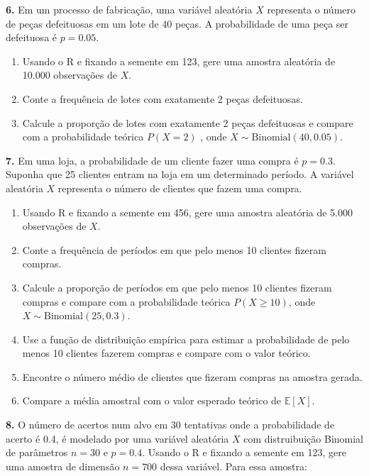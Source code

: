 \documentclass[
]{book}
\providecommand{\tightlist}{%
  \setlength{\itemsep}{0pt}\setlength{\parskip}{0pt}}
\begin{document}
\textbf{6.} Em um processo de fabricação, uma variável aleatória \(X\) representa o número de peças defeituosas em um lote de 40 peças. A probabilidade de uma peça ser defeituosa é \(p = 0.05\).

\begin{enumerate}
\def\labelenumi{(\alph{enumi})}
\tightlist
\item
  Usando o R e fixando a semente em 123, gere uma amostra aleatória de 10.000 observações de \(X\).
\item
  Conte a frequência de lotes com exatamente 2 peças defeituosas.
\item
  Calcule a proporção de lotes com exatamente 2 peças defeituosas e compare com a probabilidade teórica \(P(X = 2)\) , onde \(X \sim \text{Binomial}(40, 0.05)\).
\end{enumerate}

\textbf{7.} Em uma loja, a probabilidade de um cliente fazer uma compra é \(p = 0.3\). Suponha que 25 clientes entram na loja em um determinado período. A variável aleatória \(X\) representa o número de clientes que fazem uma compra.

\begin{enumerate}
\def\labelenumi{(\alph{enumi})}
\tightlist
\item
  Usando R e fixando a semente em 456, gere uma amostra aleatória de 5.000 observações de \(X\).
\item
  Conte a frequência de períodos em que pelo menos 10 clientes fizeram compras.
\item
  Calcule a proporção de períodos em que pelo menos 10 clientes fizeram compras e compare com a probabilidade teórica \(P(X \geq 10)\), onde \(X \sim \text{Binomial}(25, 0.3)\).
\item
  Use a função de distribuição empírica para estimar a probabilidade de pelo menos 10 clientes fazerem compras e compare com o valor teórico.
\item
  Encontre o número médio de clientes que fizeram compras na amostra gerada.
\item
  Compare a média amostral com o valor esperado teórico de \(\mathbb{E}[X]\).
\end{enumerate}

\textbf{8.} O número de acertos num alvo em 30 tentativas onde a
probabilidade de acerto é 0.4, é modelado por uma variável aleatória \(X\)
com distruibuição Binomial de parâmetros \(n=30\) e \(p=0.4\). Usando o R e
fixando a semente em 123, gere uma amostra de dimensão \(n=700\) dessa
variável. Para essa amostra:
\end{document}
